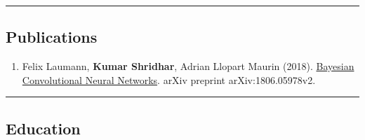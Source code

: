 \documentclass[10pt,letterpaper]{article}
\begin{document}
\begin{itemize}
\begin{itemize*}
	\end{itemize*}

\end{itemize}

\hrule
\vspace{-0.4em}
\subsection*{Publications}

\begin{enumerate}
	\parskip=0.1em
	
	
	\item Felix Laumann, \textbf{Kumar Shridhar}, Adrian Llopart Maurin (2018). \href{https://arxiv.org/abs/1806.05978v2}{Bayesian Convolutional Neural Networks}. arXiv preprint arXiv:1806.05978v2.
	

\end{enumerate}

\hrule
\vspace{-0.4em}
\subsection*{Education}
\end{document}
